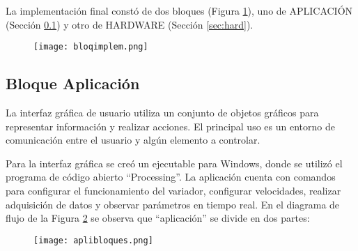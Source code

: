 La implementación final constó de dos bloques (Figura \ref{fig:implebloq}), uno de APLICACIÓN (Sección \ref{sec:aplic}) y otro de HARDWARE (Sección \ref{sec:hard}).
\begin{figure}[h!]
	\centering
	\texttt{[image: bloqimplem.png]}
	\label{fig:implebloq}
\end{figure}





\subsection{Bloque Aplicación} 	\label{sec:aplic}
\begin{tcolorbox}[colback=blue!5!white,colframe=blue!75!black,title=GUI]
	La interfaz gráfica de usuario utiliza un conjunto de objetos gráficos para representar información y realizar acciones. El principal uso es un entorno de comunicación entre el usuario y algún elemento a controlar.
\end{tcolorbox}

Para la interfaz gráfica se creó un ejecutable para Windows, donde se utilizó el programa de código abierto “Processing”. La aplicación cuenta con comandos para configurar el funcionamiento del variador, configurar velocidades, realizar adquisición de datos y observar parámetros en tiempo real.
En el diagrama de flujo de la Figura \ref{fig:bloqvis} se observa que “aplicación” se divide en dos partes: 

\begin{figure}[h]
	\centering
	\texttt{[image: aplibloques.png]}
	\label{fig:bloqvis}
\end{figure}

